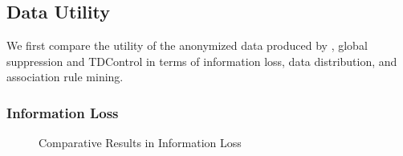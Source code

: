 
\subsection{Data Utility}\label{sec:eval:datautility}
We first compare the utility of the anonymized data produced by \PartialR,
global suppression and TDControl in terms of information loss, data distribution,
and association rule mining.

\subsubsection{Information Loss}\label{sec:eval:infoloss}

\begin{figure}[th]
\flushleft
{}
\caption{Comparative Results in Information Loss}\label{fig:loss}
\end{figure}

